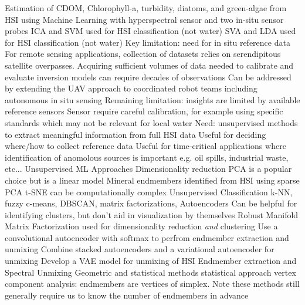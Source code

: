 \documentclass{article}
\begin{document}
\begin{outline}[enumerate]
            \4 Estimation of CDOM, Chlorophyll-a, turbidity, diatoms, and green-algae from HSI using Machine Learning with hyperspectral sensor and two in-situ sensor probes \cite{keller2018hyperspectral}
            \4 ICA and SVM used for HSI classification (not water) \cite{liang2010hyperspectral}
            \4 SVA and LDA used for HSI classification (not water) \cite{zhangSVM2014}
    \2 Key limitation: need for in situ reference data
        \3 For remote sensing applications, collection of datasets relies on serendipitous satellite overpasses. Acquiring sufficient volumes of data needed to calibrate and evaluate inversion models can require decades of observations \cite{aurin2018remote,ross2019aquasat}
        \3 Can be addressed by extending the UAV approach to coordinated robot teams including autonomous in situ sensing \cite{robot-team-1, robot-team-2}
    \2 Remaining limitation: insights are limited by available reference sensors 
        \3 Sensor require careful calibration, for example using specific standards which may not be relevant for local water
    \2 Need: unsupervised methods to extract meaningful information from full HSI data
        \3 Useful for deciding where/how to collect reference data
        \3 Useful for time-critical applications where identification of anomolous sources is important e.g. oil spills, industrial waste, etc... 
\1 Unsupervised ML Approaches
    \2 Dimensionality reduction
        \3 PCA is a popular choice but is a linear model
            \4 Mineral endmembers identified from HSI using sparse PCA \cite{yousefi2016mineral}
        \3 t-SNE can be computationally complex 
    \2 Unsupervised Classification
        \3 k-NN, fuzzy c-means, DBSCAN, matrix factorizations, Autoencoders
        \3 Can be helpful for identifying clusters, but don't aid in visualization by themselves
            \4 Robust Manifold Matrix Factorization used for dimensionality reduction \textit{and} clustering \cite{zhang2019hyperspectral}
            \4 Use a convolutional autoencoder with softmax to perfrom endmember extraction and unmixing \cite{palsson2020convolutional}
            \4 Combine stacked autoencoders and a variational autoencoder for unmixing \cite{su2019daen}
            \4 Develop a VAE model for unmixing of HSI \cite{borsoi2019deep}
    \2 Endmember extraction and Spectral Unmixing
        \3 Geometric and statistical methods
            \4 statistical approach \cite{berman2004ice}
            \4 vertex component analysis: endmembers are vertices of simplex. Note these methods still generally require us to know the number of endmembers in advance \cite{nascimento2005vertex}

\end{outline}
\end{document}
